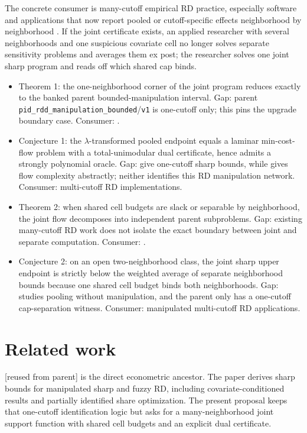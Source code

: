 \documentclass[11pt]{article}
\theoremstyle{definition}
\theoremstyle{plain}
\theoremstyle{remark}
\begin{document}
The concrete consumer is many-cutoff empirical RD practice, especially software and applications
that now report pooled or cutoff-specific effects neighborhood by neighborhood
\citep{CattaneoTitiunikVazquezBare2020,Bertanha2020}. If the joint certificate exists, an
applied researcher with several neighborhoods and one suspicious covariate cell no longer solves
separate sensitivity problems and averages them ex post; the researcher solves one joint sharp
program and reads off which shared cap binds.

\begin{itemize}[leftmargin=*]
\item Theorem 1: the one-neighborhood corner of the joint program reduces exactly to the banked parent bounded-manipulation interval. Gap: parent \texttt{pid\_rdd\_manipulation\_bounded}/\texttt{v1} is one-cutoff only; this pins the upgrade boundary case. Consumer: \citet{GerardRokkanenRothe2020}.
\item Conjecture 1: the \(\lambda\)-transformed pooled endpoint equals a laminar min-cost-flow problem with a total-unimodular dual certificate, hence admits a strongly polynomial oracle. Gap: \citet{GerardRokkanenRothe2020} give one-cutoff sharp bounds, while \citet{Orlin1993} gives flow complexity abstractly; neither identifies this RD manipulation network. Consumer: multi-cutoff RD implementations.
\item Theorem 2: when shared cell budgets are slack or separable by neighborhood, the joint flow decomposes into independent parent subproblems. Gap: existing many-cutoff RD work does not isolate the exact boundary between joint and separate computation. Consumer: \citet{CattaneoTitiunikVazquezBare2020}.
\item Conjecture 2: on an open two-neighborhood class, the joint sharp upper endpoint is strictly below the weighted average of separate neighborhood bounds because one shared cell budget binds both neighborhoods. Gap: \citet{Bertanha2020} studies pooling without manipulation, and the parent only has a one-cutoff cap-separation witness. Consumer: manipulated multi-cutoff RD applications.
\end{itemize}

\section{Related work}
\citet{GerardRokkanenRothe2020} [reused from parent] is the direct econometric ancestor. The
paper derives sharp bounds for manipulated sharp and fuzzy RD, including covariate-conditioned
results and partially identified share optimization. The present proposal keeps that one-cutoff
identification logic but asks for a many-neighborhood joint support function with shared cell
budgets and an explicit dual certificate.
\end{document}
